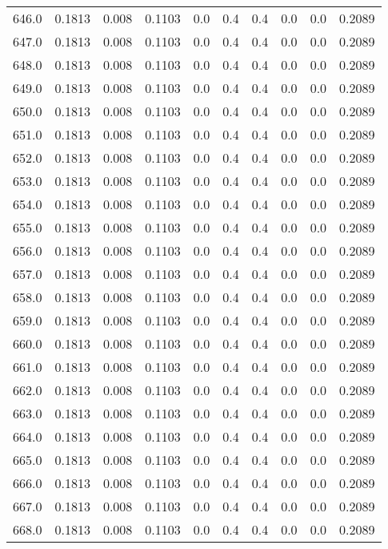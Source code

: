 \begin{longtable}{lrrrrrrrrr}
646.0 & 0.1813 & 0.008 & 0.1103 & 0.0 & 0.4 & 0.4 & 0.0 & 0.0 & 0.2089 \\
647.0 & 0.1813 & 0.008 & 0.1103 & 0.0 & 0.4 & 0.4 & 0.0 & 0.0 & 0.2089 \\
648.0 & 0.1813 & 0.008 & 0.1103 & 0.0 & 0.4 & 0.4 & 0.0 & 0.0 & 0.2089 \\
649.0 & 0.1813 & 0.008 & 0.1103 & 0.0 & 0.4 & 0.4 & 0.0 & 0.0 & 0.2089 \\
650.0 & 0.1813 & 0.008 & 0.1103 & 0.0 & 0.4 & 0.4 & 0.0 & 0.0 & 0.2089 \\
651.0 & 0.1813 & 0.008 & 0.1103 & 0.0 & 0.4 & 0.4 & 0.0 & 0.0 & 0.2089 \\
652.0 & 0.1813 & 0.008 & 0.1103 & 0.0 & 0.4 & 0.4 & 0.0 & 0.0 & 0.2089 \\
653.0 & 0.1813 & 0.008 & 0.1103 & 0.0 & 0.4 & 0.4 & 0.0 & 0.0 & 0.2089 \\
654.0 & 0.1813 & 0.008 & 0.1103 & 0.0 & 0.4 & 0.4 & 0.0 & 0.0 & 0.2089 \\
655.0 & 0.1813 & 0.008 & 0.1103 & 0.0 & 0.4 & 0.4 & 0.0 & 0.0 & 0.2089 \\
656.0 & 0.1813 & 0.008 & 0.1103 & 0.0 & 0.4 & 0.4 & 0.0 & 0.0 & 0.2089 \\
657.0 & 0.1813 & 0.008 & 0.1103 & 0.0 & 0.4 & 0.4 & 0.0 & 0.0 & 0.2089 \\
658.0 & 0.1813 & 0.008 & 0.1103 & 0.0 & 0.4 & 0.4 & 0.0 & 0.0 & 0.2089 \\
659.0 & 0.1813 & 0.008 & 0.1103 & 0.0 & 0.4 & 0.4 & 0.0 & 0.0 & 0.2089 \\
660.0 & 0.1813 & 0.008 & 0.1103 & 0.0 & 0.4 & 0.4 & 0.0 & 0.0 & 0.2089 \\
661.0 & 0.1813 & 0.008 & 0.1103 & 0.0 & 0.4 & 0.4 & 0.0 & 0.0 & 0.2089 \\
662.0 & 0.1813 & 0.008 & 0.1103 & 0.0 & 0.4 & 0.4 & 0.0 & 0.0 & 0.2089 \\
663.0 & 0.1813 & 0.008 & 0.1103 & 0.0 & 0.4 & 0.4 & 0.0 & 0.0 & 0.2089 \\
664.0 & 0.1813 & 0.008 & 0.1103 & 0.0 & 0.4 & 0.4 & 0.0 & 0.0 & 0.2089 \\
665.0 & 0.1813 & 0.008 & 0.1103 & 0.0 & 0.4 & 0.4 & 0.0 & 0.0 & 0.2089 \\
666.0 & 0.1813 & 0.008 & 0.1103 & 0.0 & 0.4 & 0.4 & 0.0 & 0.0 & 0.2089 \\
667.0 & 0.1813 & 0.008 & 0.1103 & 0.0 & 0.4 & 0.4 & 0.0 & 0.0 & 0.2089 \\
668.0 & 0.1813 & 0.008 & 0.1103 & 0.0 & 0.4 & 0.4 & 0.0 & 0.0 & 0.2089 \\

\end{longtable}
